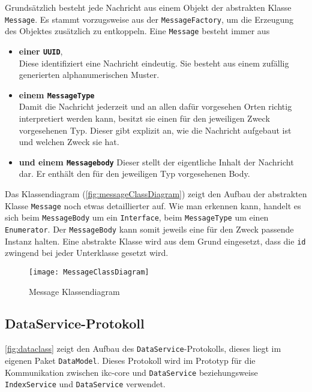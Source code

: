 Grundsätzlich besteht jede Nachricht aus einem Objekt der abstrakten Klasse \texttt{Mes\-sa\-ge}. Es stammt vorzugsweise aus der \texttt{MessageFactory}, um die Erzeugung des Objektes zusätzlich zu entkoppeln. Eine \texttt{Mes\-sa\-ge} besteht immer aus 

\begin{itemize}
    \item \textbf{einer \texttt{UUID}},\\
    Diese identifiziert eine Nachricht eindeutig. Sie besteht aus einem zufällig generierten alphanumerischen Muster.
    \item \textbf{einem \texttt{MessageType}}\\
    Damit die Nachricht jederzeit und an allen dafür vorgesehen Orten richtig interpretiert werden kann, besitzt sie einen für den jeweiligen Zweck vorgesehenen Typ. Dieser gibt explizit an, wie die Nachricht aufgebaut ist und welchen Zweck sie hat.
    \item \textbf{und einem \texttt{Messagebody}}
    Dieser stellt der eigentliche Inhalt der Nachricht dar. Er enthält den für den jeweiligen Typ vorgesehenen Body.
\end{itemize}

Das Klassendiagram (\autoref{fig:messageClassDiagram}) zeigt den Aufbau der abstrakten Klasse \texttt{Message} noch etwas detaillierter auf. Wie man erkennen kann, handelt es sich beim \texttt{MessageBody} um ein \texttt{Interface}, beim \texttt{MessageType} um einen \texttt{Enumerator}. Der \texttt{MessageBody} kann somit jeweils eine für den Zweck passende Instanz halten. Eine abstrakte Klasse wird aus dem Grund eingesetzt, dass die \texttt{id} zwingend bei jeder Unterklasse gesetzt wird.

    \begin{figure}[H]
    \centering
    \texttt{[image: MessageClassDiagram]}
    \caption{Message Klassendiagram}
    \label{fig:messageClassDiagram}
    \end{figure}

\subsection{DataService-Protokoll}

\autoref{fig:dataclass} zeigt den Aufbau des \texttt{DataService}-Protokolls, dieses liegt im eigenen Paket \texttt{DataModel}. Dieses Protokoll wird im Prototyp für die Kommunikation zwischen \gls{ikc-core} und \texttt{DataService} beziehungsweise \texttt{IndexService} und \texttt{DataService} verwendet.


